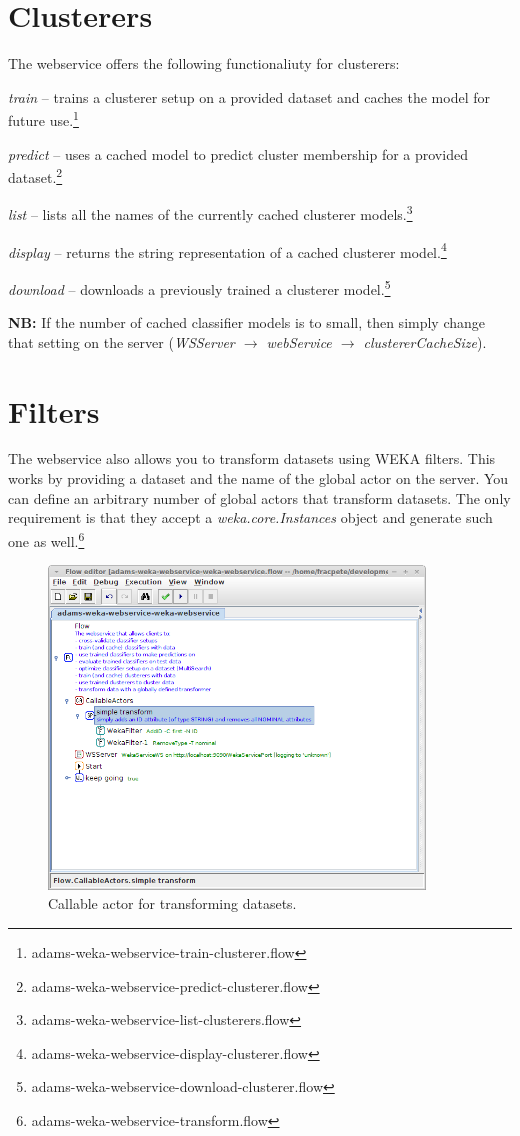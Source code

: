 \documentclass[a4paper]{book}
\begin{document}
\section{Clusterers}
The webservice offers the following functionaliuty for clusterers:
\begin{tight_itemize}
	\item \textit{train} -- trains a clusterer setup on a provided dataset 
	and caches the model for future use.\footnote{adams-weka-webservice-train-clusterer.flow}
	\item \textit{predict} -- uses a cached model to predict cluster membership
	for	a provided dataset.\footnote{adams-weka-webservice-predict-clusterer.flow}
	\item \textit{list} -- lists all the names of the currently cached clusterer
	models.\footnote{adams-weka-webservice-list-clusterers.flow}
	\item \textit{display} -- returns the string representation of a cached
	clusterer model.\footnote{adams-weka-webservice-display-clusterer.flow}
	\item \textit{download} -- downloads a previously trained a clusterer 
	model.\footnote{adams-weka-webservice-download-clusterer.flow}
\end{tight_itemize}
\textbf{NB:} If the number of cached classifier models is to small, then simply 
change that setting on the server 
(\textit{WSServer $\rightarrow$ webService $\rightarrow$ clustererCacheSize}).

\section{Filters}
The webservice also allows you to transform datasets using WEKA filters. This
works by providing a dataset and the name of the global actor on the server.
You can define an arbitrary number of global actors that transform datasets.
The only requirement is that they accept a \textit{weka.core.Instances} object
and generate such one as well.\footnote{adams-weka-webservice-transform.flow}

\begin{figure}[htb]
  \centering
  \includegraphics[width=10.0cm]{images/transform_callable_actor.png}
  \caption{Callable actor for transforming datasets.}
  \label{transform_callable_actor}
\end{figure}
\end{document}
